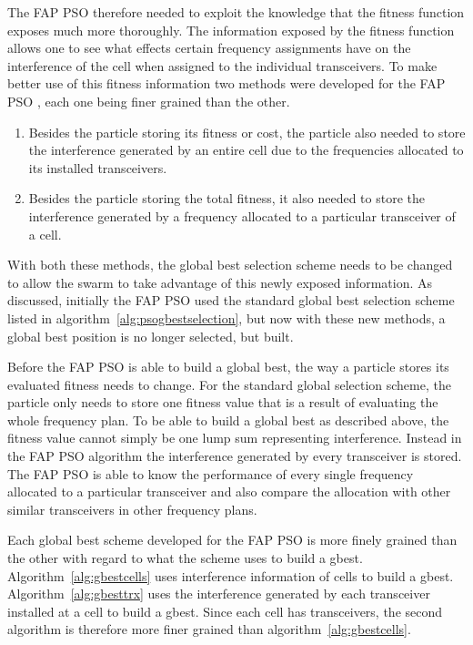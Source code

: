 The \gls{FAP} \gls{PSO} therefore needed to exploit the knowledge that the fitness function exposes much more thoroughly. The information exposed by the fitness function allows one to see what effects certain frequency assignments have on the interference of the cell when assigned to the individual transceivers. To make better use of this fitness information two methods were developed for the \gls{FAP} \gls{PSO} , each one being finer grained than the other.

\begin{enumerate}
\item Besides the particle storing its fitness or cost, the particle also needed to store the interference generated by an entire cell due to the frequencies allocated to its installed transceivers.
\item Besides the particle storing the total fitness, it also needed to store the interference generated by a frequency allocated to a particular transceiver of a cell.
\end{enumerate}

With both these methods, the global best selection scheme needs to be changed to allow the swarm to take advantage of this newly exposed information. As discussed, initially the \gls{FAP} \gls{PSO} used the standard global best selection scheme listed in algorithm~\ref{alg:psogbestselection}, but now with these new methods, a global best position is no longer selected, but built.

Before the \gls{FAP} \gls{PSO} is able to build a global best, the way a particle stores its evaluated fitness needs to change. For the standard global selection scheme, the particle only needs to store one fitness value that is a result of evaluating the whole frequency plan. To be able to build a global best as described above, the fitness value cannot simply be one lump sum representing interference. Instead in the \gls{FAP} \gls{PSO} algorithm the interference generated by every transceiver is stored. The \gls{FAP} \gls{PSO} is able to know the performance of every single frequency allocated to a particular transceiver and also compare the allocation with other similar transceivers in other frequency plans.

Each global best scheme developed for the \gls{FAP} \gls{PSO} is more finely grained than the other with regard to what the scheme uses to build a gbest. Algorithm~\ref{alg:gbestcells} uses interference information of cells to build a gbest. Algorithm~\ref{alg:gbesttrx} uses the interference generated by each transceiver installed at a cell to build a gbest. Since each cell has transceivers, the second algorithm is therefore more finer grained than algorithm~\ref{alg:gbestcells}.

